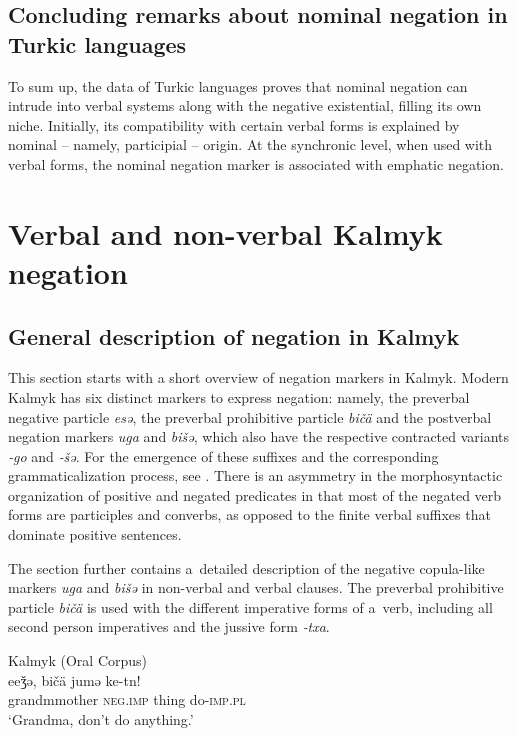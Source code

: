 \documentclass[output=paper]{langsci/langscibook}
\begin{document}
\subsection{Concluding remarks about nominal negation in Turkic languages}\label{sec:BK2.4}

To sum up, the data of Turkic languages proves that nominal negation can intrude into verbal systems along with the negative existential, filling its own niche. Initially, its compatibility with certain verbal forms is explained by nominal – namely, participial – origin. At the synchronic level, when used with verbal forms, the nominal negation marker is associated with emphatic negation.

\section{Verbal and non-verbal Kalmyk negation}\label{sec:BK3}

\subsection{General description of negation in Kalmyk}\label{sec:BK3.1}

This section starts with a short overview of negation markers in Kalmyk. Modern Kalmyk has six distinct markers to express negation: namely, the preverbal negative particle \textit{esǝ}, the preverbal prohibitive particle \textit{bičä} and the postverbal negation markers \textit{uga} and \textit{bišǝ}, which also have the respective contracted variants \textit{‑go} and \textit{‑šǝ}. For the emergence of these suffixes and the corresponding grammaticalization process, see \citet{baranova2018a}. There is an asymmetry in the morphosyntactic organization of positive and negated predicates in that most of the negated verb forms are participles and converbs, as opposed to the finite verbal suffixes that dominate positive sentences. 

The section further contains a detailed description of the negative copula-like markers \textit{uga} and \textit{bišǝ} in non-verbal and verbal clauses. The preverbal prohibitive particle \textit{bičä} is used with the different imperative forms of a verb, including all second person imperatives and the jussive form \textit{‑txa}.

\ea Kalmyk (Oral Corpus) \label{ex:BK32}\\
	\gll eeǯǝ,				bičä		jumǝ	ke-tn!\\
	grandmmother	\textsc{neg.imp}	thing	do-\textsc{imp.pl}\\
	\glt `Grandma, don’t do anything.'
\z
\end{document}

